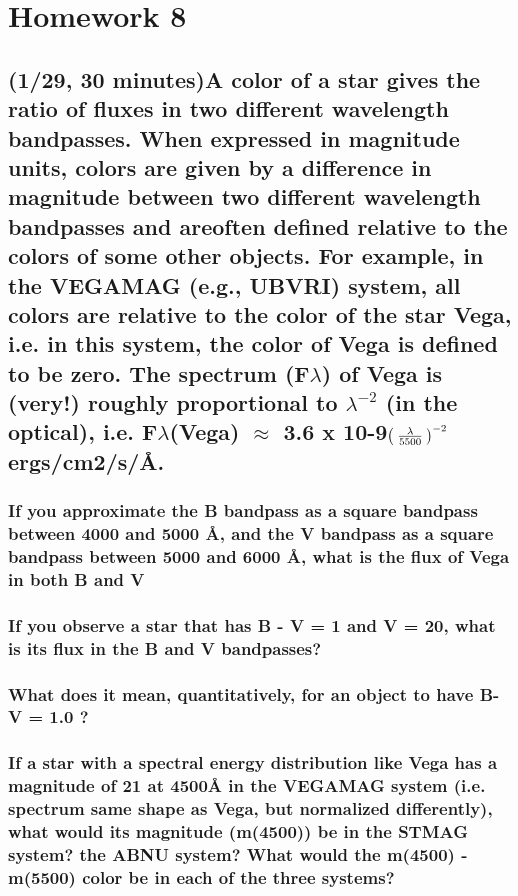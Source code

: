 \documentclass[12pt]{article}
\begin{document}
\section*{Homework 8}
\date{01/29/2016}
\subsection*{
(1/29, 30 minutes)A color of a star gives the ratio of fluxes in two
different wavelength bandpasses. When expressed in magnitude units,
colors are given by a difference in magnitude between two different
wavelength bandpasses and areoften defined relative to the colors of
some other objects. For example, in the VEGAMAG (e.g., UBVRI) system,
all colors are relative to the color of the star Vega, i.e. in this
system, the color of Vega is defined to be zero. The spectrum
(F$\scriptstyle \lambda$) of Vega is (very!) roughly proportional to $
\lambda^{{-2}}_{}$ (in the optical), i.e. F$\scriptstyle
\lambda$(Vega) $ \approx$ 3.6 x 10-9$ \left(\vphantom{{\lambda\over
5500}}\right.$$ {\lambda\over 5500}$$ \left.\vphantom{{\lambda\over
5500}}\right)^{{-2}}_{}$ergs/cm2/s/Å. 
}

\subsubsection{
If you approximate the B bandpass as a square bandpass between 4000
and 5000 Å, and the V bandpass as a square bandpass between 5000 and
6000 Å, what is the flux of Vega in both B and V}

\subsubsection{
If you observe a star that has B - V = 1 and V = 20, what is its flux
in the B and V bandpasses?}

\subsubsection{
What does it mean, quantitatively, for an object to have B-V = 1.0 ?}

\subsubsection{
If a star with a spectral energy distribution like Vega has a
magnitude of 21 at 4500Å in the VEGAMAG system (i.e. spectrum same
shape as Vega, but normalized differently), what would its magnitude
(m(4500)) be in the STMAG system? the ABNU system? What would the
m(4500) - m(5500) color be in each of the three systems?}
\end{document}
